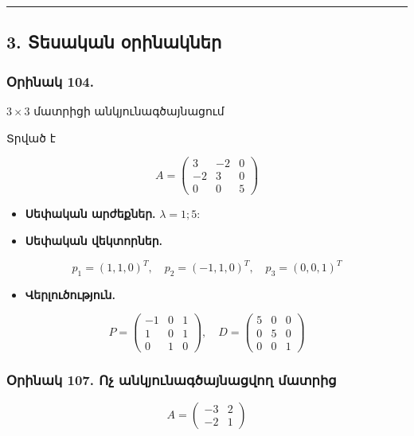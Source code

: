 \documentclass[12pt, a4paper]{article}
\begin{document}
\vspace{1em}
\hrule
\vspace{1em}

\subsection{3. Տեսական օրինակներ}

\subsubsection{Օրինակ 104.}
$3 \times 3$ մատրիցի անկյունագծայնացում

Տրված է

$$
A =
\begin{pmatrix}
3 & -2 & 0 \\
-2 & 3 & 0 \\
0 & 0 & 5
\end{pmatrix}
$$

\begin{itemize}
    \item \textbf{Սեփական արժեքներ.} $\lambda = 1; 5$:
    \item \textbf{Սեփական վեկտորներ.}
\end{itemize}

$$
p_1 = (1, 1, 0)^T, \quad
p_2 = (-1, 1, 0)^T, \quad
p_3 = (0, 0, 1)^T
$$

\begin{itemize}
    \item \textbf{Վերլուծություն.}
\end{itemize}

$$
P =
\begin{pmatrix}
-1 & 0 & 1 \\
1 & 0 & 1 \\
0 & 1 & 0
\end{pmatrix},
\quad
D =
\begin{pmatrix}
5 & 0 & 0 \\
0 & 5 & 0 \\
0 & 0 & 1
\end{pmatrix}
$$

\subsubsection{Օրինակ 107. Ոչ անկյունագծայնացվող մատրից}

$$
A =
\begin{pmatrix}
-3 & 2 \\
-2 & 1
\end{pmatrix}
$$
\end{document}
